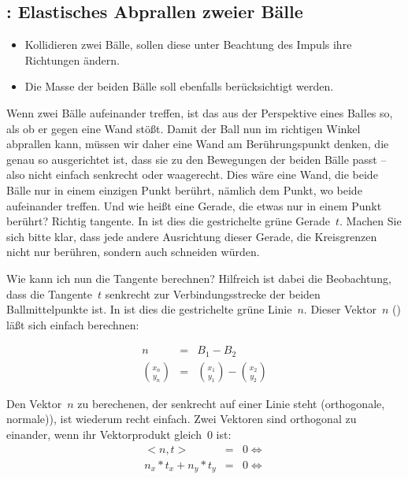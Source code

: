 \subsection{: Elastisches Abprallen zweier Bälle}

\begin{itemize}
    \item Kollidieren zwei Bälle, sollen diese unter Beachtung des Impuls ihre Richtungen ändern.\label{reqBälle0401}
    \item Die Masse der beiden Bälle soll ebenfalls berücksichtigt werden.\label{reqBälle0402}
\end{itemize}
\er

Wenn zwei Bälle aufeinander treffen, ist das aus der Perspektive eines Balles so, als ob er gegen eine Wand stößt. Damit der Ball nun im richtigen Winkel abprallen kann, müssen wir daher eine Wand am Berührungspunkt denken, die genau so ausgerichtet ist, dass sie zu den Bewegungen der beiden Bälle passt -- also nicht einfach senkrecht oder waagerecht. Dies wäre eine Wand, die beide Bälle nur in einem einzigen Punkt berührt, nämlich dem Punkt, wo beide aufeinander treffen. Und wie heißt eine Gerade, die etwas nur in einem Punkt berührt? Richtig \gls{tangente}. In  ist dies die gestrichelte grüne Gerade~$t$. Machen Sie sich bitte klar, dass jede andere Ausrichtung dieser Gerade, die Kreisgrenzen nicht nur berühren, sondern auch schneiden würden.

Wie kann ich nun die Tangente berechnen? Hilfreich ist dabei die Beobachtung, dass die Tangente~$t$ senkrecht zur Verbindungsstrecke der beiden Ballmittelpunkte ist. In  ist dies die gestrichelte grüne Linie~$n$. Dieser Vektor~$n$ () läßt sich einfach berechnen:

\begin{eqnarray}
	n  & = & B_1 - B_2 \nonumber \\
    {x_n \choose y_n} & = & {x_1 \choose y_1} - {x_2 \choose y_2} \label{eqNormvektor}
\end{eqnarray}

Den Vektor~$n$ zu berechenen, der senkrecht auf einer Linie steht (\gls{orthogonale}, \gls{normale})), ist wiederum recht einfach. Zwei Vektoren sind orthogonal zu einander, wenn ihr Vektorprodukt gleich~0 ist:
\begin{eqnarray}
	<n, t>                & = & 0 \Longleftrightarrow \nonumber \\
    n_x * t_x + n_y * t_y & = & 0 \Longleftrightarrow \label{eqOrthoAllg}
\end{eqnarray}

